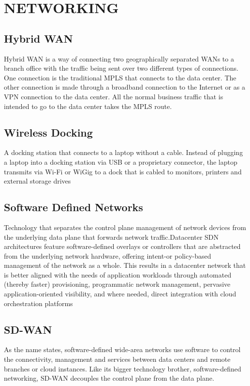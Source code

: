 \documentclass[10pt,a4paper]{article}
\begin{document}
\newpage \normalsize
\section{NETWORKING}
\subsection{Hybrid WAN}
\justifying
Hybrid WAN is a way of connecting two geographically separated WANs to a branch office with the traffic being sent over two different types of connections. One connection is the traditional MPLS that connects to the data center. The other connection is made through a broadband connection to the Internet or as a VPN connection to the data center. All the normal business traffic that is intended to go to the data center takes the MPLS route.
\subsection{Wireless Docking}
\justifying
A docking station that connects to a laptop without a cable. Instead of plugging a laptop into a docking station via USB or a proprietary connector, the laptop transmits via Wi-Fi or WiGig to a dock that is cabled to monitors, printers and external storage drives
\subsection{Software Defined Networks}
\justifying
Technology that separates the control plane management of network devices from the underlying data plane that forwards network traffic.Datacenter SDN architectures feature software-defined overlays or controllers that are abstracted from the underlying network hardware, offering intent-or policy-based management of the network as a whole. This results in a datacenter network that is better aligned with the needs of application workloads through automated (thereby faster) provisioning, programmatic network management, pervasive application-oriented visibility, and where needed, direct integration with cloud orchestration platforms
\subsection{SD-WAN}
\justifying
As the name states, software-defined wide-area networks use software to control the connectivity, management and services between data centers and remote branches or cloud instances. Like its bigger technology brother, software-defined networking, SD-WAN decouples the control plane from the data plane.
\end{document}

